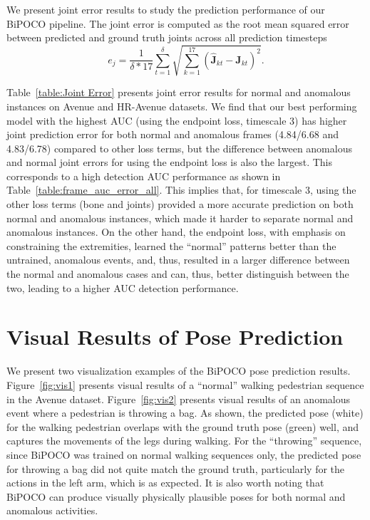\documentclass[nohyperref]{article}
\theoremstyle{plain}
\theoremstyle{definition}
\theoremstyle{remark}
\begin{document}
We present joint error results to study the prediction performance of our BiPOCO pipeline. The joint error is computed as the root mean squared error between predicted and ground truth joints across all prediction timesteps
\begin{equation}
\label{eqn:jointerror}
e_j = \frac{1}{\delta*17} \sum_{t=1}^{\delta} \sqrt{ \sum_{k=1}^{17} (\hat{\mathbf{J}}_{kt} - \mathbf{J}_{kt})^2 }.
\end{equation}


Table~\ref{table:Joint Error} presents joint error results for normal and anomalous instances on Avenue and HR-Avenue datasets. We find that our best performing model with the highest AUC (using the endpoint loss, timescale 3) has higher joint prediction error for both normal and anomalous frames (4.84/6.68 and 4.83/6.78) compared to other loss terms, but the difference between anomalous and normal joint errors for using the endpoint loss is also the largest. This corresponds to a high detection AUC performance as shown in Table~\ref{table:frame_auc_error_all}. This implies that, for timescale 3, using the other loss terms (bone and joints) provided a more accurate prediction on both normal and anomalous instances, which made it harder to separate normal and anomalous instances. On the other hand, the endpoint loss, with emphasis on constraining the extremities, learned the ``normal'' patterns better than the untrained, anomalous events, and, thus, resulted in a larger difference between the normal and anomalous cases and can, thus, better distinguish between the two, leading to a higher AUC detection performance. 





\section{Visual Results of Pose Prediction}

We present two visualization examples of the BiPOCO pose prediction results. Figure~\ref{fig:vis1} presents visual results of a ``normal'' walking pedestrian sequence in the Avenue dataset. Figure~\ref{fig:vis2} presents visual results of an anomalous event where a pedestrian is throwing a bag. As shown, the predicted pose (white) for the walking pedestrian overlaps with the ground truth pose (green) well, and captures the movements of the legs during walking. For the ``throwing'' sequence, since BiPOCO was trained on normal walking sequences only, the predicted pose for throwing a bag did not quite match the ground truth, particularly for the actions in the left arm, which is as expected. It is also worth noting that BiPOCO can produce visually physically plausible poses for both normal and anomalous activities.
\end{document}

